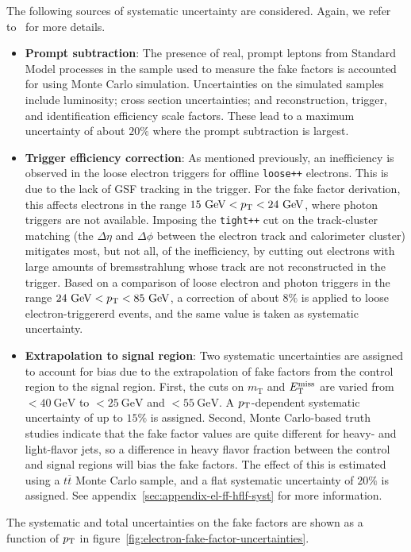 The following sources of systematic uncertainty are considered. Again, we refer to~\cite{DeViveiros:1670929} for more details.
\begin{itemize}
  \item \textbf{Prompt subtraction}: The presence of real, prompt leptons from Standard Model processes in the sample used to measure the fake factors is accounted for using Monte Carlo simulation. Uncertainties on the simulated samples include luminosity; cross section uncertainties; and reconstruction, trigger, and identification efficiency scale factors. These lead to a maximum uncertainty of about $20\%$ where the prompt subtraction is largest. 
  \item \textbf{Trigger efficiency correction}: As mentioned previously, an inefficiency is observed in the loose electron triggers for offline \verb.loose++. electrons. This is due to the lack of GSF tracking in the trigger. For the fake factor derivation, this affects electrons in the range $15~\mbox{GeV}<p_{\text{T}}<24~\mbox{GeV}$, where photon triggers are not available. Imposing the \verb.tight++. cut on the track-cluster matching (the $\Delta \eta$ and $\Delta \phi$ between the electron track and calorimeter cluster) mitigates most, but not all, of the inefficiency, by cutting out electrons with large amounts of bremsstrahlung whose track are not reconstructed in the trigger. Based on a comparison of loose electron and photon triggers in the range $24~\mbox{GeV}<p_{\text{T}}<85~\mbox{GeV}$, a correction of about $8\%$ is applied to loose electron-triggererd events, and the same value is taken as systematic uncertainty.
  \item \textbf{Extrapolation to signal region}: Two systematic uncertainties are assigned to account for bias due to the extrapolation of fake factors from the control region to the signal region. First, the cuts on $m_{\mathrm{T}}$ and $E_{\text{T}}^{\text{miss}}$ are varied from $<40~\mbox{GeV}$ to $<25~\mbox{GeV}$ and $<55~\mbox{GeV}$. A $p_{\text{T}}$-dependent systematic uncertainty of up to $15\%$ is assigned. Second, Monte Carlo-based truth studies indicate that the fake factor values are quite different for heavy- and light-flavor jets, so a difference in heavy flavor fraction between the control and signal regions will bias the fake factors. The effect of this is estimated using a $t\overline{t}$ Monte Carlo sample, and a flat systematic uncertainty of $20\%$ is assigned. See appendix~\ref{sec:appendix-el-ff-hflf-syst} for more information.
\end{itemize}
The systematic and total uncertainties on the fake factors are shown as a function of $p_{\text{T}}$ in figure~\ref{fig:electron-fake-factor-uncertainties}.


